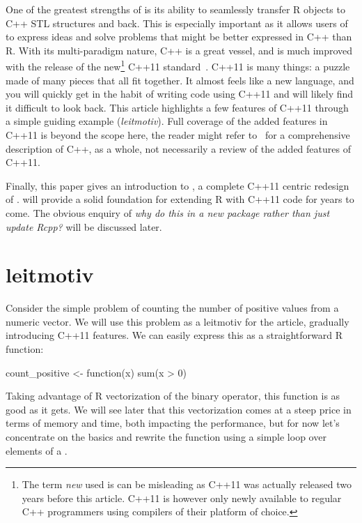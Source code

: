 One of the greatest strengths of  is its ability to
seamlessly transfer R objects to C++ STL structures and back. This is
especially important as it allows users of  to express ideas
and solve problems that might be better expressed in C++ than R.
With its multi-paradigm
nature, C++ is a great vessel, and is much improved with the release of the
new\footnote{The term \emph{new} used is can be misleading as
C++11 was actually released two years before this article. C++11 is however
only newly available to regular C++ programmers using compilers of their
platform of choice.} C++11 standard~\citep{Cpp11}. C++11 is many things: a puzzle
made of many pieces that all fit together. It almost feels like a new language,
and you will quickly get in the
habit of writing code using C++11 and will likely find it difficult to
look back. This article highlights a few features of C++11 through a simple
guiding example (\emph{leitmotiv}). Full coverage of the added features in
C++11 is beyond the scope here, the reader might refer to~\citep{Stroustrup2013}
for a comprehensive description of C++, as a whole, not necessarily a review
of the added features of C++11.

Finally, this paper gives an introduction to ,
a complete C++11 centric redesign of .  will
provide a solid foundation for extending R with C++11 code for years to come.
The obvious enquiry of \emph{why do this in a new package rather than just
update Rcpp?} will be discussed later.

\section{leitmotiv}

Consider the simple problem of counting the number of positive values
from a numeric vector. We will use this problem as a leitmotiv for the
article, gradually introducing C++11 features.
We can easily express this as a straightforward R function:

\begin{example}
count_positive <- function(x){
  sum(x > 0)
}
\end{example}

Taking advantage of R vectorization of the \code{>} binary operator, this
function is as good as it gets. We will see later that this vectorization
comes at a steep price in terms of memory and time, both impacting the
performance, but for now let's concentrate on the basics and
rewrite the function using a simple  loop over elements of a
.

